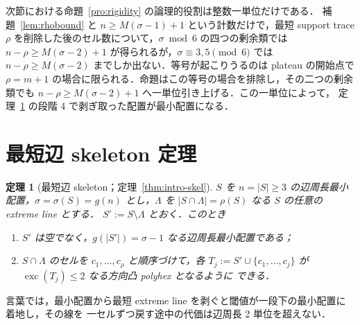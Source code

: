 \documentclass[11pt]{article}
\theoremstyle{plain}
\newtheorem{theorem}{定理}[section]
\theoremstyle{definition}
\theoremstyle{remark}
\newcommand{\sm}{\setminus}
\DeclareMathOperator{\exc}{exc}
\begin{document}
次節における命題~\ref{pro:rigidity} の論理的役割は整数一単位だけである．
補題~\ref{lem:rhobound} と \(n\ge M(\sigma-1)+1\) という計数だけで，最短 support trace
\(\rho\) を削除した後のセル数について，\(\sigma\bmod6\) の四つの剰余類では
\(n-\rho\ge M(\sigma-2)+1\) が得られるが，\(\sigma\equiv3,5\pmod6\) では
\(n-\rho\ge M(\sigma-2)\) までしか出ない．等号が起こりうるのは plateau の開始点で
\(\rho=m+1\) の場合に限られる．命題はこの等号の場合を排除し，その二つの剰余類でも
\(n-\rho\ge M(\sigma-2)+1\) へ一単位引き上げる．この一単位によって，
定理~\ref{thm:skel} の段階 4 で剥ぎ取った配置が最小配置になる．

\section{最短辺 skeleton 定理}\label{sec:skeleton}

\begin{theorem}[最短辺 skeleton；定理~\ref{thm:intro-skel}]\label{thm:skel}
\(S\) を \(n=|S|\ge3\) の辺周長最小配置，\(\sigma=\sigma(S)=g(n)\) とし，\(\Lambda\) を
\(|S\cap\Lambda|=\rho(S)\) なる \(S\) の\emph{任意の} extreme line とする．
\(S':=S\sm\Lambda\) とおく．このとき
\begin{enumerate}
\item[(i)] \(S'\) は空でなく，\(g(|S'|)=\sigma-1\) なる辺周長最小配置である；
\item[(ii)] \(S\cap\Lambda\) のセルを \(c_{1},\dots,c_{\rho}\) と順序づけて，各
\(T_{j}:=S'\cup\{c_{1},\dots,c_{j}\}\) が \(\exc(T_{j})\le2\) なる方向凸 polyhex となるように
できる．
\end{enumerate}
\end{theorem}

言葉では，最小配置から最短 extreme line を剥ぐと閾値が一段下の最小配置に着地し，その線を
一セルずつ戻す途中の代価は辺周長 2 単位を超えない．
\end{document}
